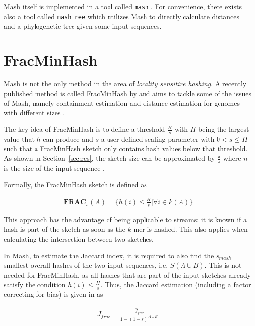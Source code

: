 Mash itself is implemented in a tool called \texttt{mash}
\cite{ondovMashFastGenome2016}. For convenience, there exists also a tool called
\texttt{mashtree} \cite{katzMashtreeRapidComparison2019} which utilizes Mash to
directly calculate distances and a phylogenetic tree given some input sequences.

\section{FracMinHash}
Mash is not the only method in the area of \textit{locality sensitive hashing}.
A recently published method is called FracMinHash by
\cite{irberLightweightCompositionalAnalysis2022} and aims to tackle some of the
issues of Mash, namely containment estimation and distance estimation for
genomes with different sizes
\cite{heraDerivingConfidenceIntervals2023,koslickiImprovingMinHashContainment2019}.

The key idea of FracMinHash is to define a threshold $\frac{H}{s}$ with $H$
being the largest value that $h$ can produce and $s$ a user defined scaling
parameter with $0 < s \leq H$ such that a FracMinHash sketch only contains hash
values below that threshold. As shown in Section~\ref{sec:res}, the sketch size
can be approximated by $\frac{n}{s}$ where $n$ is the size of the input sequence
\cite{irberLightweightCompositionalAnalysis2022,heraDerivingConfidenceIntervals2023}.


Formally, the FracMinHash sketch is defined as 

\begin{align}
  \mathbf{FRAC}_s(A) = \{h(i) \leq \frac{H}{s} | \forall i \in k(A)\}
\end{align}

This approach has the advantage of being applicable to streams: it is known if a
hash is part of the sketch as soon as the $k$-mer is hashed. This also applies
when calculating the intersection between two sketches. 

In Mash, to estimate the Jaccard index, it is required to also find the
$s_{mash}$ smallest overall hashes of the two input sequences, i.e. $S(A \cup
B)$. This is not needed for FracMinHash, as all hashes that are part of the
input sketches already satisfy the condition $h(i) \leq \frac{H}{s}$. Thus, the
Jaccard estimation (including a factor correcting for bias) is given in
\cite{heraDerivingConfidenceIntervals2023} as

\begin{align}
  J_{frac} = \frac{\hat{J}_{frac}}{1 - (1 - s)^{|A \cup B|}}
\end{align}

